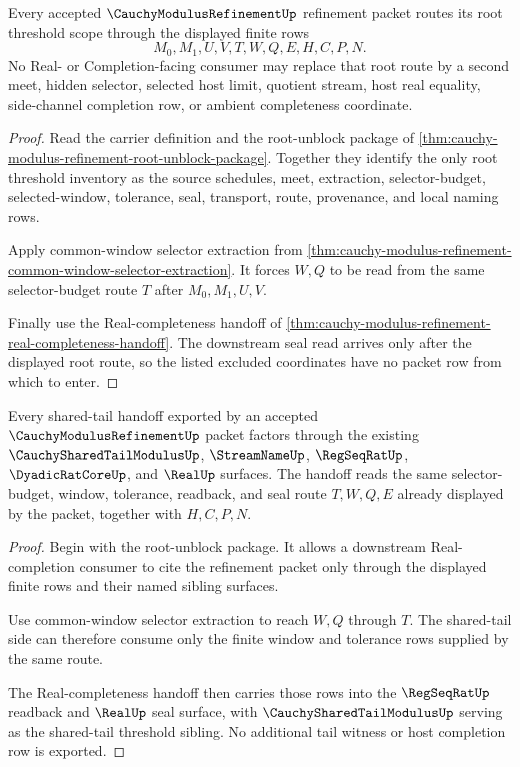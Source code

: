 \begin{theorem}
\label{thm:cauchy-modulus-refinement-root-threshold-scope}
Every accepted $\CauchyModulusRefinementUp$ refinement packet routes its root threshold scope through the displayed finite rows
$$
M_0,M_1,U,V,T,W,Q,E,H,C,P,N.
$$
No Real- or Completion-facing consumer may replace that root route by a second meet, hidden selector, selected host limit, quotient stream, host real equality, side-channel completion row, or ambient completeness coordinate.
\end{theorem}
\begin{proof}
Read the carrier definition and the root-unblock package of \autoref{thm:cauchy-modulus-refinement-root-unblock-package}. Together they identify the only root threshold inventory as the source schedules, meet, extraction, selector-budget, selected-window, tolerance, seal, transport, route, provenance, and local naming rows.

Apply common-window selector extraction from \autoref{thm:cauchy-modulus-refinement-common-window-selector-extraction}. It forces $W,Q$ to be read from the same selector-budget route $T$ after $M_0,M_1,U,V$.

Finally use the Real-completeness handoff of \autoref{thm:cauchy-modulus-refinement-real-completeness-handoff}. The downstream seal read arrives only after the displayed root route, so the listed excluded coordinates have no packet row from which to enter.
\end{proof}

\begin{theorem}
\label{thm:cauchy-modulus-refinement-shared-tail-handoff}
Every shared-tail handoff exported by an accepted $\CauchyModulusRefinementUp$ packet factors through the existing $\CauchySharedTailModulusUp$, $\StreamNameUp$, $\RegSeqRatUp$, $\DyadicRatCoreUp$, and $\RealUp$ surfaces. The handoff reads the same selector-budget, window, tolerance, readback, and seal route $T,W,Q,E$ already displayed by the packet, together with $H,C,P,N$.
\end{theorem}
\begin{proof}
Begin with the root-unblock package. It allows a downstream Real-completion consumer to cite the refinement packet only through the displayed finite rows and their named sibling surfaces.

Use common-window selector extraction to reach $W,Q$ through $T$. The shared-tail side can therefore consume only the finite window and tolerance rows supplied by the same route.

The Real-completeness handoff then carries those rows into the $\RegSeqRatUp$ readback and $\RealUp$ seal surface, with $\CauchySharedTailModulusUp$ serving as the shared-tail threshold sibling. No additional tail witness or host completion row is exported.
\end{proof}


